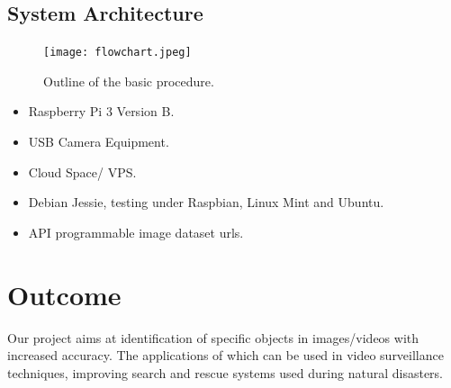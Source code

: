 \documentclass{article}
\begin{document}
\subsection{System Architecture}

\begin{figure}
  \texttt{[image: flowchart.jpeg]}
  \caption{Outline of the basic procedure.}
  \label{fig:flowchart1}
\end{figure}

\begin{itemize}
  \item Raspberry Pi 3 Version B.
  \item USB Camera Equipment.
  \item Cloud Space/ VPS.
  \item Debian Jessie, testing under Raspbian, Linux Mint and Ubuntu.
  \item API programmable image dataset urls.
\end{itemize}

\section{Outcome}

Our project aims at identification of specific objects in images/videos with increased accuracy. The applications of which can be used in video surveillance techniques, improving search and rescue systems used during natural disasters. \\

 
 
\end{document}
